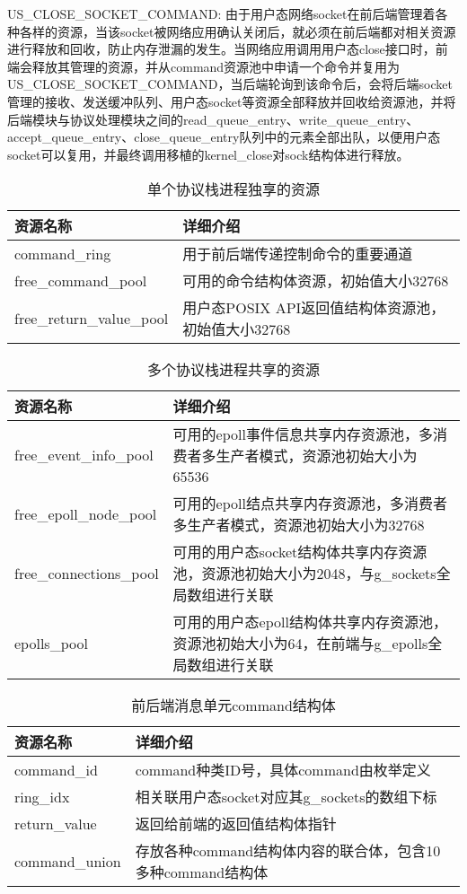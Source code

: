US\_CLOSE\_SOCKET\_COMMAND: 由于用户态网络socket在前后端管理着各种各样的资源，当该socket被网络应用确认关闭后，就必须在前后端都对相关资源进行释放和回收，防止内存泄漏的发生。当网络应用调用用户态close接口时，前端会释放其管理的资源，并从command资源池中申请一个命令并复用为US\_CLOSE\_SOCKET\_COMMAND，当后端轮询到该命令后，会将后端socket管理的接收、发送缓冲队列、用户态socket等资源全部释放并回收给资源池，并将后端模块与协议处理模块之间的read\_queue\_entry、write\_queue\_entry、accept\_queue\_entry、close\_queue\_entry队列中的元素全部出队，以便用户态socket可以复用，并最终调用移植的kernel\_close对sock结构体进行释放。

\begin{table}[]
\centering
\caption{单个协议栈进程独享的资源}
\label{tab:onecore}
\begin{tabular}{lp{10cm}}
\toprule[1.5pt]
\textbf{资源名称} & \textbf{详细介绍} \\ 
\midrule[1pt]
command\_ring & 用于前后端传递控制命令的重要通道 \\
free\_command\_pool & 可用的命令结构体资源，初始值大小32768  \\
free\_return\_value\_pool & 用户态POSIX API返回值结构体资源池，初始值大小32768 \\
\bottomrule[1.5pt]
\end{tabular}
\end{table}

\begin{table}[]
\centering
\caption{多个协议栈进程共享的资源}
\label{tab:multicore}
\begin{tabular}{lp{10cm}}
\toprule[1.5pt]
\textbf{资源名称} & \textbf{详细介绍} \\ 
\midrule[1pt]
free\_event\_info\_pool & 可用的epoll事件信息共享内存资源池，多消费者多生产者模式，资源池初始大小为65536 \\
free\_epoll\_node\_pool & 可用的epoll结点共享内存资源池，多消费者多生产者模式，资源池初始大小为32768  \\
free\_connections\_pool & 可用的用户态socket结构体共享内存资源池，资源池初始大小为2048，与g\_sockets全局数组进行关联 \\
epolls\_pool & 可用的用户态epoll结构体共享内存资源池，资源池初始大小为64，在前端与g\_epolls全局数组进行关联 \\
\bottomrule[1.5pt]
\end{tabular}
\end{table}

\begin{table}[]
\centering
\caption{前后端消息单元command结构体}
\label{tab:command}
\begin{tabular}{lp{10cm}}
\toprule[1.5pt]
\textbf{资源名称} & \textbf{详细介绍} \\ 
\midrule[1pt]
command\_id & command种类ID号，具体command由枚举定义 \\
ring\_idx & 相关联用户态socket对应其g\_sockets的数组下标 \\
return\_value & 返回给前端的返回值结构体指针 \\
command\_union & 存放各种command结构体内容的联合体，包含10多种command结构体 \\
\bottomrule[1.5pt]
\end{tabular}
\end{table}

